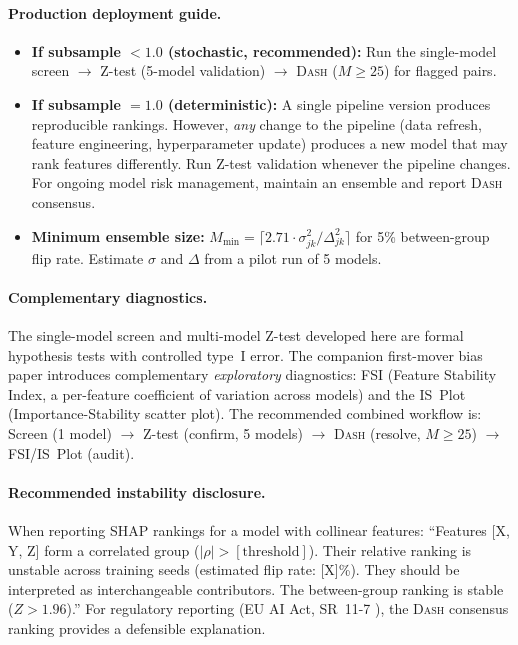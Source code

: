 \documentclass{article}
\newcommand{\DASH}{\textsc{Dash}}
\begin{document}
\paragraph{Production deployment guide.}
\begin{itemize}
    \item \textbf{If subsample $< 1.0$ (stochastic, recommended):} Run the single-model screen $\to$ Z-test (5-model validation) $\to$ \DASH{} ($M \geq 25$) for flagged pairs.
    \item \textbf{If subsample $= 1.0$ (deterministic):} A single pipeline version produces reproducible rankings. However, \emph{any} change to the pipeline (data refresh, feature engineering, hyperparameter update) produces a new model that may rank features differently. Run Z-test validation whenever the pipeline changes. For ongoing model risk management, maintain an ensemble and report \DASH{} consensus.
    \item \textbf{Minimum ensemble size:} $M_{\min} = \lceil 2.71 \cdot \sigma_{jk}^2/\Delta_{jk}^2 \rceil$ for 5\% between-group flip rate. Estimate $\sigma$ and $\Delta$ from a pilot run of 5 models.
\end{itemize}

\paragraph{Complementary diagnostics.}
The single-model screen and multi-model Z-test developed here are formal hypothesis tests with controlled type~I error. The companion first-mover bias paper \citep{caraker2026firstmover} introduces complementary \emph{exploratory} diagnostics: FSI (Feature Stability Index, a per-feature coefficient of variation across models) and the IS~Plot (Importance-Stability scatter plot). The recommended combined workflow is: Screen (1 model) $\to$ Z-test (confirm, 5 models) $\to$ \DASH{} (resolve, $M \geq 25$) $\to$ FSI/IS~Plot (audit).

\paragraph{Recommended instability disclosure.}
When reporting SHAP rankings for a model with collinear features: ``Features [X, Y, Z] form a correlated group ($|\rho| > [\text{threshold}]$). Their relative ranking is unstable across training seeds (estimated flip rate: [X]\%). They should be interpreted as interchangeable contributors. The between-group ranking is stable ($Z > 1.96$).'' For regulatory reporting (EU AI Act, SR~11-7 \citep{occ2011sr117}), the \DASH{} consensus ranking provides a defensible explanation.
\end{document}
